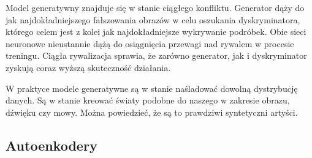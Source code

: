   Model generatywny znajduje się w stanie ciągłego konfliktu. Generator dąży do jak najdokładniejszego fałszowania obrazów w celu oszukania dyskryminatora, którego celem jest z kolei jak najdokładniejsze wykrywanie podróbek. Obie sieci neuronowe nieustannie dążą do osiągnięcia przewagi nad rywalem w procesie treningu. Ciągła rywalizacja sprawia, że zarówno generator, jak i dyskryminator zyskują coraz wyższą skuteczność działania.

   W praktyce modele generatywne są w stanie naśladować dowolną dystrybucję danych. Są w stanie kreować światy podobne do naszego w zakresie obrazu, dźwięku czy mowy. Można powiedzieć, że są to prawdziwi syntetyczni artyści.

   \subsection{Autoenkodery}
   \label{autoenkodery}
